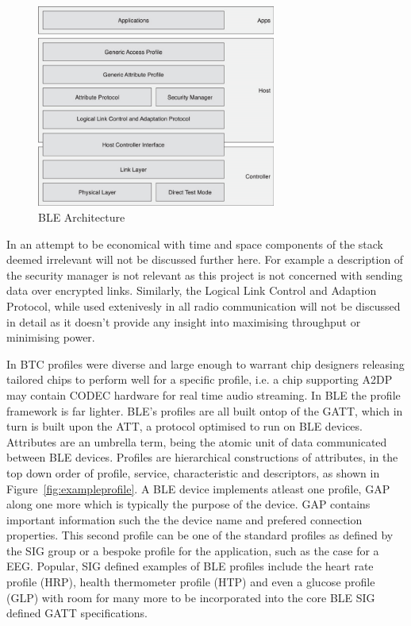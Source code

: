 \documentclass[]{article}
\begin{document}
\begin{figure}[htb]
	\begin{center}
		\includegraphics[width = 0.7\textwidth]{ble_arch}
	\end{center}
	\caption{\ac{BLE} Architecture}
	\label{fig:ble_arch}
\end{figure}

In an attempt to be economical with time and space components of the stack deemed irrelevant will not be discussed further here. For example a description of the security manager is not relevant as this project is not concerned with sending data over encrypted links. Similarly, the Logical Link Control and Adaption Protocol, while used extenivesly in all radio communication will not be discussed in detail as it doesn't provide any insight into maximising throughput or minimising power.

In \ac{BTC} profiles were diverse and large enough to warrant chip designers releasing tailored chips to perform well for a specific profile, i.e. a chip supporting A2DP may contain \ac{CODEC} hardware for real time audio streaming. In \ac{BLE} the profile framework is far lighter. \ac{BLE}'s profiles are all built ontop of  the \ac{GATT}, which in turn is built upon the \ac{ATT}, a protocol optimised to run on BLE devices. Attributes are an umbrella term, being the atomic unit of data communicated between BLE devices. Profiles are hierarchical constructions of attributes, in the top down order of profile, service, characteristic and descriptors, as shown in Figure~\ref{fig:exampleprofile}. A BLE device implements atleast one profile, \ac{GAP} along one more which is typically the purpose of the device. \ac{GAP} contains important information such the the device name and prefered connection properties.  This second profile can be one of the standard profiles as defined by the SIG group or a bespoke profile for the application, such as the case for a \ac{EEG}. Popular, SIG defined examples of \ac{BLE} profiles include the heart rate profile (HRP), health thermometer profile (HTP) and even a glucose profile (GLP) with room for many more to be incorporated into the core \ac{BLE} \ac{SIG} defined \ac{GATT} specifications.  
\end{document}
